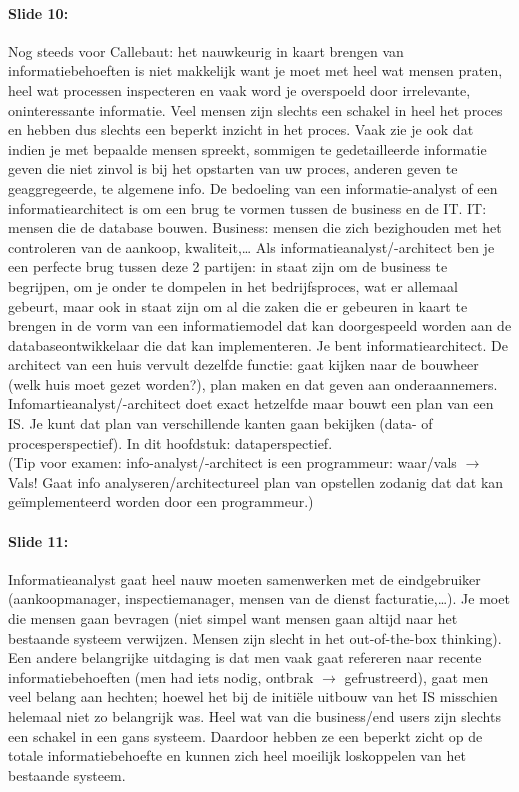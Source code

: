 \documentclass[10pt,a4paper]{report}
\begin{document}
\paragraph{Slide 10:}Nog steeds voor Callebaut: het nauwkeurig in kaart brengen van informatiebehoeften is niet makkelijk want je moet met heel wat mensen praten, heel wat processen inspecteren en vaak word je overspoeld door irrelevante, oninteressante informatie. Veel mensen zijn slechts een schakel in heel het proces en hebben dus slechts een beperkt inzicht in het proces. Vaak zie je ook dat indien je met bepaalde mensen spreekt, sommigen te gedetailleerde informatie geven die niet zinvol is bij het opstarten van uw proces, anderen geven te geaggregeerde, te algemene info. De bedoeling van een informatie-analyst of een informatiearchitect is om een brug te vormen tussen de business en de IT. IT: mensen die de database bouwen. Business: mensen die zich bezighouden met het controleren van de aankoop, kwaliteit,… Als informatieanalyst/-architect ben je een perfecte brug tussen deze 2 partijen: in staat zijn om de business te begrijpen, om je onder te dompelen in het bedrijfsproces, wat er allemaal gebeurt, maar ook in staat zijn om al die zaken die er gebeuren in kaart te brengen in de vorm van een informatiemodel dat kan doorgespeeld worden aan de databaseontwikkelaar die dat kan implementeren. Je bent informatiearchitect. De architect van een huis vervult dezelfde functie: gaat kijken naar de bouwheer (welk huis moet gezet worden?), plan maken en dat geven aan onderaannemers. Infomartieanalyst/-architect doet exact hetzelfde maar bouwt een plan van een IS. Je kunt dat plan van verschillende kanten gaan bekijken (data- of procesperspectief). In dit hoofdstuk: dataperspectief.\\
(Tip voor examen: info-analyst/-architect is een programmeur: waar/vals $\rightarrow$ Vals! Gaat info analyseren/architectureel plan van opstellen zodanig dat dat kan geïmplementeerd worden door een programmeur.)

\paragraph{Slide 11:}Informatieanalyst gaat heel nauw moeten samenwerken met de eindgebruiker (aankoopmanager, inspectiemanager, mensen van de dienst facturatie,…). Je moet die mensen gaan bevragen (niet simpel want mensen gaan altijd naar het bestaande systeem verwijzen. Mensen zijn slecht in het out-of-the-box thinking). Een andere belangrijke uitdaging is dat men vaak gaat refereren naar recente informatiebehoeften (men had iets nodig, ontbrak $\rightarrow$ gefrustreerd), gaat men veel belang aan hechten; hoewel het bij de initiële uitbouw van het IS misschien helemaal niet zo belangrijk was. Heel wat van die business/end users zijn slechts een schakel in een gans systeem. Daardoor hebben ze een beperkt zicht op de totale informatiebehoefte en kunnen zich heel moeilijk loskoppelen van het bestaande systeem.
\end{document}
